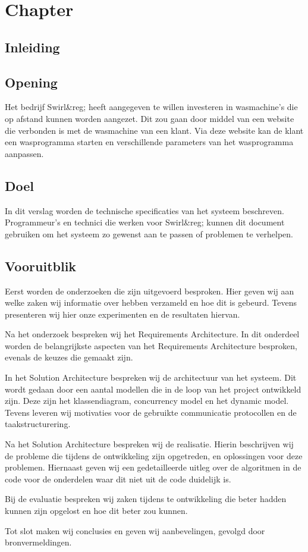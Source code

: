 \chapter{Chapter}
\section{Inleiding}
\newpage

\section{Opening}
Het bedrijf Swirl&reg; heeft aangegeven te willen investeren in wasmachine's die op afstand kunnen worden aangezet.
Dit zou gaan door middel van een website die verbonden is met de wasmachine van een klant. Via deze website kan de klant een wasprogramma starten en verschillende parameters van het wasprogramma aanpassen.


\section{Doel}
In dit verslag worden de technische specificaties van het systeem beschreven.
Programmeur's en technici die werken voor Swirl&reg; kunnen dit document gebruiken om het systeem zo gewenst aan te passen of problemen te verhelpen.

\section{Vooruitblik}
Eerst worden de onderzoeken die zijn uitgevoerd besproken.
Hier geven wij aan welke zaken wij informatie over hebben verzameld en hoe dit is gebeurd. Tevens presenteren wij hier onze experimenten en de resultaten hiervan.

Na het onderzoek bespreken wij het Requirements Architecture. In dit onderdeel worden de belangrijkste aspecten van het Requirements Architecture besproken, evenals de keuzes die gemaakt zijn.

In het Solution Architecture bespreken wij de architectuur van het systeem. Dit wordt gedaan door een aantal modellen die in de loop van het project ontwikkeld zijn. Deze zijn het klassendiagram, concurrency model en het dynamic model.
Tevens leveren wij motivaties voor de gebruikte communicatie protocollen en de taakstructurering.

Na het Solution Architecture bespreken wij de realisatie. Hierin beschrijven wij de probleme die tijdens de ontwikkeling zijn opgetreden, en oplossingen voor deze problemen.
Hiernaast geven wij een gedetailleerde uitleg over de algoritmen in de code voor de onderdelen waar dit niet uit de code duidelijk is.

Bij de evaluatie bespreken wij zaken tijdens te ontwikkeling die beter hadden kunnen zijn opgelost en hoe dit beter zou kunnen.

Tot slot maken wij conclusies en geven wij aanbevelingen, gevolgd door bronvermeldingen.